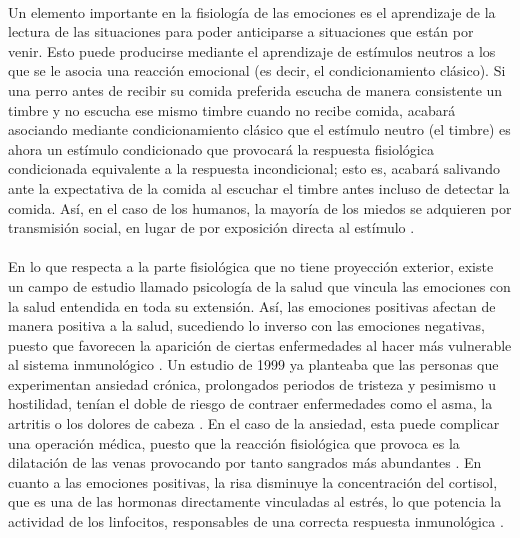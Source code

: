 \paragraph{}
Un elemento importante en la fisiología de las emociones es el aprendizaje de la lectura de las situaciones para poder anticiparse a situaciones que están por venir. Esto puede producirse mediante el aprendizaje de estímulos neutros a los que se le asocia una reacción emocional (es decir, el condicionamiento clásico). Si una perro antes de recibir su comida preferida escucha de manera consistente un timbre y no escucha ese mismo timbre cuando no recibe comida, acabará asociando mediante condicionamiento clásico que el estímulo neutro (el timbre) es ahora un estímulo condicionado que provocará la respuesta fisiológica condicionada equivalente a la respuesta incondicional; esto es, acabará salivando ante la expectativa de la comida al escuchar el timbre antes incluso de detectar la comida. Así, en el caso de los humanos, la mayoría de los miedos se adquieren por transmisión social, en lugar de por exposición directa al estímulo \citep{olsson2007learning}.

\paragraph{}
En lo que respecta a la parte fisiológica que no tiene proyección exterior, existe un campo de estudio llamado psicología de la salud que vincula las emociones con la salud entendida en toda su extensión. Así, las emociones positivas afectan de manera positiva a la salud, sucediendo lo inverso con las emociones negativas, puesto que favorecen la aparición de ciertas enfermedades al hacer más vulnerable al sistema inmunológico \citep{moure2011}. Un estudio de 1999 ya planteaba que las personas que experimentan ansiedad crónica, prolongados periodos de tristeza y pesimismo u hostilidad, tenían el doble de riesgo de contraer enfermedades como el asma, la artritis o los dolores de cabeza \citep{lopez1999}. En el caso de la ansiedad, esta puede complicar una operación médica, puesto que la reacción fisiológica que provoca es la dilatación de las venas provocando por tanto sangrados más abundantes \citep{moure2011}. En cuanto a las emociones positivas, la risa disminuye la concentración del cortisol, que es una de las hormonas directamente vinculadas al estrés, lo que potencia la actividad de los linfocitos, responsables de una correcta respuesta inmunológica \citep{berk2008cortisol}.

